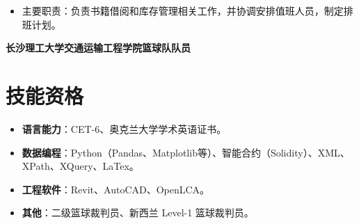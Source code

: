 \documentclass[11pt,a4paper,fontset=none]{ctexart}
\newcommand{\rinfo}[1]{\begin{itemize}[leftmargin=1.2em, labelindent=0pt, labelwidth=0.7em, labelsep=0.5em, itemindent=0pt, label=$\circ$, nosep, topsep=0.15em, itemsep=0em, parsep=0em, partopsep=0em]\item #1\end{itemize}}
\begin{document}
\rinfo{主要职责：负责书籍借阅和库存管理相关工作，并协调安排值班人员，制定排班计划。}


\vspace{0.05em}
\noindent
\textbf{长沙理工大学}\hfill\textbf{交通运输工程学院篮球队队员}

\section*{技能资格}
\vspace{-0.1em}
\rinfo{\textbf{语言能力}：CET-6、奥克兰大学学术英语证书。}

\rinfo{\textbf{数据编程}：Python（Pandas、Matplotlib等）、智能合约（Solidity）、XML、XPath、XQuery、LaTex。}

\rinfo{\textbf{工程软件}：Revit、AutoCAD、OpenLCA。}

\rinfo{\textbf{其他}：二级篮球裁判员、新西兰 Level-1 篮球裁判员。}
\end{document}
